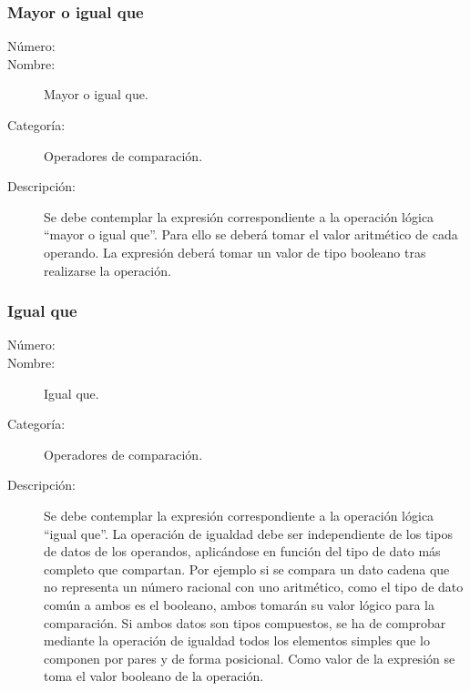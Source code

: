 \subsubsection{Mayor o igual que}
	\begin{description}
		\item [Número:] \cn
		\item [Nombre:] Mayor o igual que.
		\item [Categoría:] Operadores de comparación.
		\item [Descripción:] Se debe contemplar la expresión correspondiente a la operación lógica ``mayor o igual que''. Para ello se deberá tomar
		el valor aritmético de cada operando. La expresión deberá tomar un valor de tipo booleano tras realizarse la operación.
	\end {description}

\subsubsection{Igual que}
	\begin{description}
		\item [Número:] \cn
		\item [Nombre:] Igual que.
		\item [Categoría:] Operadores de comparación.
		\item [Descripción:] Se debe contemplar la expresión correspondiente a la operación lógica ``igual que''. La operación de igualdad
		debe ser independiente de los tipos de datos de los operandos, aplicándose en función del tipo de dato más completo que compartan.
		Por ejemplo si se compara un dato cadena que no representa un número racional con uno aritmético, como el tipo de dato común a ambos
		es el booleano, ambos tomarán su valor lógico para la comparación.  
		Si ambos datos son tipos compuestos, se ha de comprobar mediante la operación de igualdad todos los elementos simples que lo componen
		por pares y de forma posicional.
		Como valor de la expresión se toma el valor booleano de la operación.
	\end {description}

